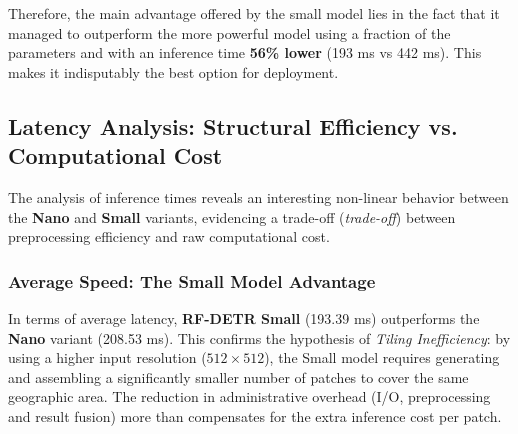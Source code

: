 Therefore, the main advantage offered by the small model lies in the fact that it managed to outperform the more powerful model using a fraction of the parameters and with an inference time \textbf{56\% lower} (193 ms vs 442 ms). This makes it indisputably the best option for deployment.

\subsection{Latency Analysis: Structural Efficiency vs. Computational Cost}

The analysis of inference times reveals an interesting non-linear behavior between the \textbf{Nano} and \textbf{Small} variants, evidencing a trade-off (\textit{trade-off}) between preprocessing efficiency and raw computational cost.

\subsubsection{Average Speed: The Small Model Advantage}

In terms of average latency, \textbf{RF-DETR Small} (193.39 ms) outperforms the \textbf{Nano} variant (208.53 ms). This confirms the hypothesis of \textit{Tiling Inefficiency}: by using a higher input resolution ($512 \times 512$), the Small model requires generating and assembling a significantly smaller number of patches to cover the same geographic area. The reduction in administrative overhead (I/O, preprocessing and result fusion) more than compensates for the extra inference cost per patch.

